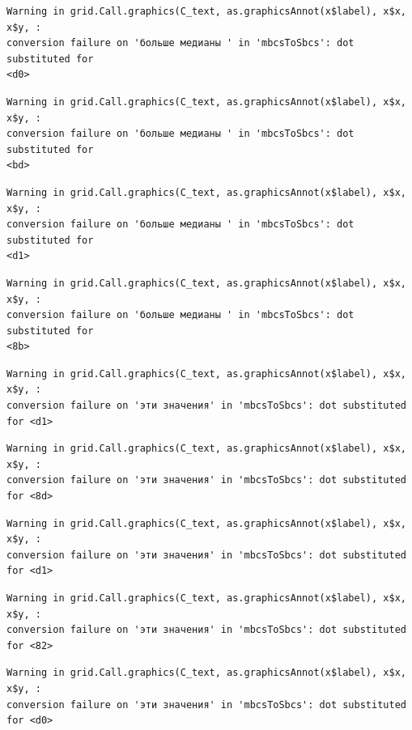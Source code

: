 \documentclass[
  letterpaper,
]{scrbook}
\theoremstyle{definition}
\theoremstyle{remark}
\begin{document}
\begin{verbatim}
Warning in grid.Call.graphics(C_text, as.graphicsAnnot(x$label), x$x, x$y, :
conversion failure on 'больше медианы ' in 'mbcsToSbcs': dot substituted for
<d0>
\end{verbatim}

\begin{verbatim}
Warning in grid.Call.graphics(C_text, as.graphicsAnnot(x$label), x$x, x$y, :
conversion failure on 'больше медианы ' in 'mbcsToSbcs': dot substituted for
<bd>
\end{verbatim}

\begin{verbatim}
Warning in grid.Call.graphics(C_text, as.graphicsAnnot(x$label), x$x, x$y, :
conversion failure on 'больше медианы ' in 'mbcsToSbcs': dot substituted for
<d1>
\end{verbatim}

\begin{verbatim}
Warning in grid.Call.graphics(C_text, as.graphicsAnnot(x$label), x$x, x$y, :
conversion failure on 'больше медианы ' in 'mbcsToSbcs': dot substituted for
<8b>
\end{verbatim}

\begin{verbatim}
Warning in grid.Call.graphics(C_text, as.graphicsAnnot(x$label), x$x, x$y, :
conversion failure on 'эти значения' in 'mbcsToSbcs': dot substituted for <d1>
\end{verbatim}

\begin{verbatim}
Warning in grid.Call.graphics(C_text, as.graphicsAnnot(x$label), x$x, x$y, :
conversion failure on 'эти значения' in 'mbcsToSbcs': dot substituted for <8d>
\end{verbatim}

\begin{verbatim}
Warning in grid.Call.graphics(C_text, as.graphicsAnnot(x$label), x$x, x$y, :
conversion failure on 'эти значения' in 'mbcsToSbcs': dot substituted for <d1>
\end{verbatim}

\begin{verbatim}
Warning in grid.Call.graphics(C_text, as.graphicsAnnot(x$label), x$x, x$y, :
conversion failure on 'эти значения' in 'mbcsToSbcs': dot substituted for <82>
\end{verbatim}

\begin{verbatim}
Warning in grid.Call.graphics(C_text, as.graphicsAnnot(x$label), x$x, x$y, :
conversion failure on 'эти значения' in 'mbcsToSbcs': dot substituted for <d0>
\end{verbatim}
\end{document}
